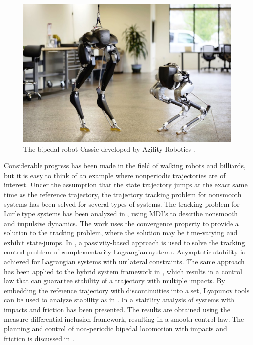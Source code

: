 \documentclass[../DC2017114Bouma.tex]{subfiles}
\begin{document}
\begin{figure}[H]
\centering
\includegraphics[width=.6\textwidth]{cassie.jpg}\caption{The bipedal robot Cassie developed by Agility Robotics \cite{Cassie}.}\label{fig:cassie}
\end{figure}

Considerable progress has been made in the field of walking robots and billiards, but it is easy to think of an example where nonperiodic trajectories are of interest. Under the assumption that the state trajectory jumps at the exact same time as the reference trajectory, the trajectory tracking problem for nonsmooth systems has been solved for several types of systems. The tracking problem for Lur'e type systems has been analyzed in \cite{VanDeWouw2008,Wouw2010}, using MDI's to describe nonsmooth and impulsive dynamics. The work uses the convergence property to provide a solution to the tracking problem, where the solution may be time-varying and exhibit state-jumps. In \cite{Bourgeot2005}, a passivity-based approach is used to solve the tracking control problem of complementarity Lagrangian systems. Asymptotic stability is achieved for Lagrangian systems with unilateral constraints. The same approach has been applied to the hybrid system framework in \cite{Naldi2013}, which results in a control law that can guarantee stability of a trajectory with multiple impacts. By embedding the reference trajectory with discontinuities into a set, Lyapunov tools can be used to analyze stability as in \cite{Sanfelice2011,Sanfelice2014}. In \cite{Posa2016} a stability analysis of systems with impacts and friction has been presented. The results are obtained using the measure-differential inclusion framework, resulting in a smooth control law. The planning and control of non-periodic bipedal locomotion with impacts and friction is discussed in \cite{Zhao2015a}.
\end{document}
